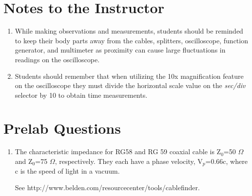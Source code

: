 \section{Notes to the Instructor}
\begin{enumerate}
\item While making observations and measurements, students should be reminded to keep their body parts away from the cables, splitters, oscilloscope, function generator, and multimeter as proximity can cause large fluctuations in readings on the oscilloscope.
\item Students should remember that when utilizing the 10x magnification feature on the oscilloscope they must divide the horizontal scale value on the {\it sec/div} selector by 10 to obtain time measurements. 
\end{enumerate}

\section{Prelab Questions}
\begin{enumerate}
\item The characteristic impedance for RG58 and RG 59 coaxial cable is Z$_0$=50 $\Omega$ and Z$_0$=75 $\Omega$, respectively. They each have a phase velocity, V$_p$=0.66c, where c is the speed of light in a vacuum.

See http://www.belden.com/resourcecenter/tools/cablefinder.
\end{enumerate}



